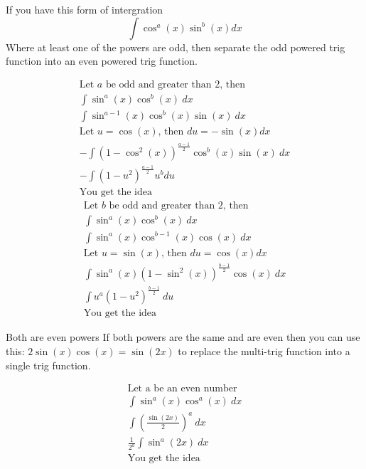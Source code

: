 \documentclass[letterpaper,10pt,twoside,twocolumn,openany]{book}
\begin{document}
\begin{commentbox}{If you have this form of intergration}
    \begin{equation}
        \int \cos^a(x) \sin^b(x) dx
    \end{equation}
    Where at least one of the powers are odd, then separate the odd powered trig function into an even powered trig function.
\end{commentbox}
\begin{gather*}
    \text{Let $a$ be odd and greater than 2, then}\\
    \int \sin^a(x) \cos^b(x)\ dx\\
    \int \sin^{a-1}(x) \cos^b(x) \sin(x)\ dx\\
    \text{Let $u = \cos(x)$, then $du = -\sin(x)dx$}\\
    -\int(1 - \cos^2(x))^{\frac{a-1}{2}} \cos^b(x) \sin(x)\ dx\\
    -\int (1 - u^2)^{\frac{a-1}{2}}  u^b du\\
    \text{You get the idea}
\end{gather*} 
\newpage
\begin{gather*}
    \text{Let $b$ be odd and greater than 2, then}\\
    \int \sin^a(x) \cos^b(x)\ dx\\
    \int \sin^a(x) \cos^{b-1}(x) \cos(x)\ dx\\
    \text{Let $u = \sin(x)$, then $du = \cos(x)dx$}\\
    \int \sin^a(x)(1 - \sin^2(x))^{\frac{b-1}{2}} \cos(x)\ dx\\
    \int u^a (1 - u^2)^{\frac{b-1}{2}}\ du\\
    \text{You get the idea}
\end{gather*}
\begin{commentbox}{Both are even powers}
    If both powers are the same and are even then you can use this: $2 \sin(x) \cos(x) = \sin(2x)$ to replace the multi-trig function into a single trig function.
\end{commentbox}
\begin{gather*}
    \text{Let a be an even number}\\
    \int \sin^a(x) \cos^a(x)\ dx\\
    \int \left(\frac{\sin(2x)}{2}\right)^a\ dx\\
    \frac{1}{2^a} \int \sin^a(2x)\ dx\\
    \text{You get the idea}
\end{gather*}
\end{document}
